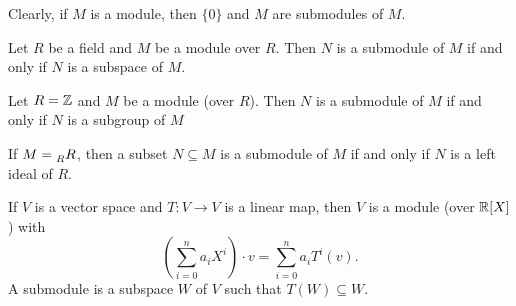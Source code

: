 Clearly, if $M$ is a module, then $\{0\}$ and $M$ are submodules of $M$. 

\begin{example}
Let $R$ be a field and $M$ be a module over $R$. Then
$N$ is a submodule of $M$ if and only if $N$ is a subspace of $M$. 
\end{example}

\begin{example}
Let $R=\mathbb{Z}$ and $M$ be a module (over $R$). Then
$N$ is a submodule of $M$ if and only if $N$ is a subgroup of $M$
\end{example}

\begin{example}
If $M=\prescript{}{R}R$, then a subset $N\subseteq M$ is a submodule
of $M$ if and only if $N$ is a left ideal of $R$. 
\end{example}

\begin{example}
If $V$ is a vector space and $T\colon V\to V$ is a linear map, then
$V$ is a module (over $\mathbb{R}[X]$) with  
\[
\left(\sum_{i=0}^na_iX^i\right)\cdot v=\sum_{i=0}^na_iT^i(v).
\]
A submodule is a subspace $W$ 
of $V$ such that $T(W)\subseteq W$. 
\end{example}


